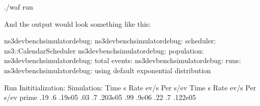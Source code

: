 \documentclass[letterpaper,10pt,english]{sphinxmanual}
\begin{document}
\begin{sphinxVerbatim}[commandchars=\\\{\}]
\PYGZdl{} ./waf \PYGZhy{}\PYGZhy{}run 
\end{sphinxVerbatim}

And the output would look something like this:

\begin{sphinxVerbatim}[commandchars=\\\{\}]
ns3\PYGZhy{}dev\PYGZhy{}bench\PYGZhy{}simulator\PYGZhy{}debug:
ns3\PYGZhy{}dev\PYGZhy{}bench\PYGZhy{}simulator\PYGZhy{}debug: scheduler: ns3::CalendarScheduler
ns3\PYGZhy{}dev\PYGZhy{}bench\PYGZhy{}simulator\PYGZhy{}debug: population: 
ns3\PYGZhy{}dev\PYGZhy{}bench\PYGZhy{}simulator\PYGZhy{}debug: total events: 
ns3\PYGZhy{}dev\PYGZhy{}bench\PYGZhy{}simulator\PYGZhy{}debug: runs: 
ns3\PYGZhy{}dev\PYGZhy{}bench\PYGZhy{}simulator\PYGZhy{}debug: using default exponential distribution

Run        Inititialization:                   Simulation:
            Time s    Rate ev/s Per s/ev  Time s    Rate ev/s Per s/ev
\PYGZhy{}\PYGZhy{}\PYGZhy{}\PYGZhy{}\PYGZhy{}\PYGZhy{}\PYGZhy{}\PYGZhy{}\PYGZhy{}\PYGZhy{}\PYGZhy{} \PYGZhy{}\PYGZhy{}\PYGZhy{}\PYGZhy{}\PYGZhy{}\PYGZhy{}\PYGZhy{}\PYGZhy{}\PYGZhy{}\PYGZhy{}\PYGZhy{} \PYGZhy{}\PYGZhy{}\PYGZhy{}\PYGZhy{}\PYGZhy{}\PYGZhy{}\PYGZhy{}\PYGZhy{}\PYGZhy{}\PYGZhy{}\PYGZhy{} \PYGZhy{}\PYGZhy{}\PYGZhy{}\PYGZhy{}\PYGZhy{}\PYGZhy{}\PYGZhy{}\PYGZhy{}\PYGZhy{}\PYGZhy{}\PYGZhy{} \PYGZhy{}\PYGZhy{}\PYGZhy{}\PYGZhy{}\PYGZhy{}\PYGZhy{}\PYGZhy{}\PYGZhy{}\PYGZhy{}\PYGZhy{}\PYGZhy{} \PYGZhy{}\PYGZhy{}\PYGZhy{}\PYGZhy{}\PYGZhy{}\PYGZhy{}\PYGZhy{}\PYGZhy{}\PYGZhy{}\PYGZhy{}\PYGZhy{} \PYGZhy{}\PYGZhy{}\PYGZhy{}\PYGZhy{}\PYGZhy{}\PYGZhy{}\PYGZhy{}\PYGZhy{}\PYGZhy{}\PYGZhy{}\PYGZhy{}
prime     .19        .6     .19e\PYGZhy{}05    .03       .7     .203e\PYGZhy{}05
           .99              .9e\PYGZhy{}06     .22       .7     .122e\PYGZhy{}05
\end{sphinxVerbatim}
\end{document}
